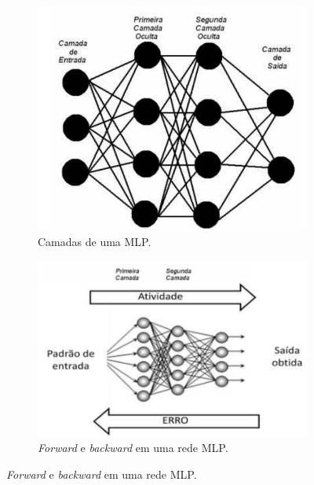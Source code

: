\begin{figure}[h]
    \centering
    \caption{Estrutura e atividade de uma rede MLP, imagens de \cite{su12114776}.}
    \begin{subfigure}{0.4\textwidth}
      \centering
      \includegraphics[width=\linewidth]{figuras/MLP/rede_MLP.png}
      \caption{Camadas de uma MLP.}
      \label{fig:subfigura1}
    \end{subfigure}
    \hspace{5mm}
    \begin{subfigure}{0.45\textwidth}
      \centering
      \includegraphics[width=\linewidth]{figuras/MLP/atividade_MLP.png}
      \caption{\textit{Forward} e \textit{backward} em uma rede MLP.}
      \label{fig:subfigura2}
    \end{subfigure}
    \label{fig:subfiguras}
  \end{figure}

